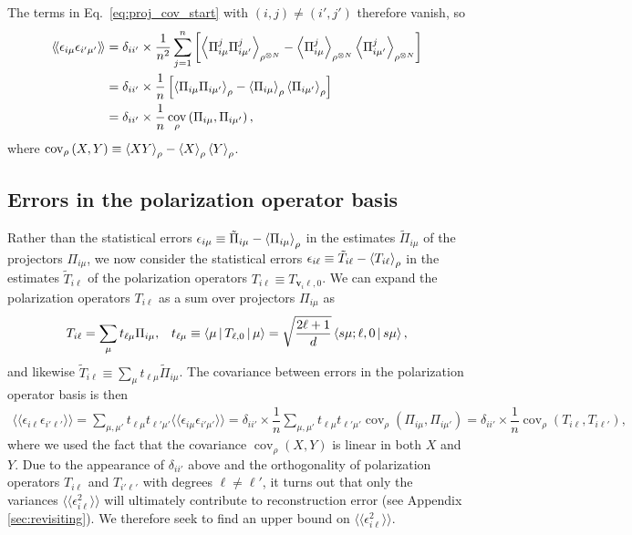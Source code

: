 \documentclass[a4paper,twocolumn,unpublished]{quantumarticle}
\newcommand{\f}[2]{\dfrac{#1}{#2}} %
\newcommand{\p}[1]{\left(#1\right)} %
\renewcommand{\sp}[1]{\left[#1\right]} %
\newcommand{\bk}{\Braket} %
\newcommand{\bbk}[1]{\langle\!\langle #1 \rangle\!\rangle}
\DeclareMathOperator{\cov}{cov}
\begin{document}
The terms in Eq.~\eqref{eq:proj_cov_start} with $\p{i,j}\ne\p{i',j'}$ therefore vanish, so
\begin{align}
  \bbk{\epsilon_{i\mu} \epsilon_{i'\mu'}}
  &= \delta_{ii'} \times \f1{n^2} \sum_{j=1}^n \sp{\bk{\Pi_{i\mu}^j \Pi_{i\mu'}^j}_{\rho^{\otimes N}}
    - \bk{\Pi_{i\mu}^j}_{\rho^{\otimes N}}
    \bk{\Pi_{i\mu'}^j}_{\rho^{\otimes N}}} \\
  &= \delta_{ii'} \times \f1n \sp{\bk{\Pi_{i\mu} \Pi_{i\mu'}}_\rho
    - \bk{\Pi_{i\mu}}_\rho \bk{\Pi_{i\mu'}}_\rho} \\
  &= \delta_{ii'} \times \f1n \cov_\rho\p{\Pi_{i\mu}, \Pi_{i\mu'}},
\end{align}
where $\cov_\rho\p{X,Y} \equiv \bk{XY}_\rho - \bk{X}_\rho \bk{Y}_\rho$.

\subsection{Errors in the polarization operator basis}

Rather than the statistical errors $\epsilon_{i\mu} \equiv \tilde\Pi_{i\mu} - \bk{\Pi_{i\mu}}_\rho$ in the estimates $\tilde\Pi_{i\mu}$ of the projectors $\Pi_{i\mu}$, we now consider the statistical errors $\epsilon_{i\ell} \equiv \tilde T_{i\ell} - \bk{T_{i\ell}}_\rho$ in the estimates $\tilde T_{i\ell}$ of the polarization operators $T_{i\ell} \equiv T_{\bm v_i\ell,0}$.
We can expand the polarization operators $T_{i\ell}$ as a sum over projectors $\Pi_{i\mu}$ as
\begin{align}
  T_{i\ell} = \sum_\mu t_{\ell\mu} \Pi_{i\mu},
  &&
  t_{\ell\mu} \equiv \bk{\mu|T_{\ell,0}|\mu}
  = \sqrt{\f{2\ell+1}{d}} \bk{s\mu;\ell,0|s\mu},
\end{align}
and likewise $\tilde T_{i\ell} \equiv \sum_\mu t_{\ell\mu} \tilde\Pi_{i\mu}$.
The covariance between errors in the polarization operator basis is then
\begin{align}
  \bbk{\epsilon_{i\ell} \epsilon_{i'\ell'}}
  = \sum_{\mu,\mu'} t_{\ell\mu} t_{\ell'\mu'}
  \bbk{\epsilon_{i\mu} \epsilon_{i'\mu'}}
  = \delta_{ii'} \times \f1n
  \sum_{\mu,\mu'} t_{\ell\mu} t_{\ell'\mu'}
  \cov_\rho\p{\Pi_{i\mu}, \Pi_{i\mu'}}
  = \delta_{ii'} \times \f1n \cov_\rho\p{T_{i\ell}, T_{i\ell'}},
\end{align}
where we used the fact that the covariance $\cov_\rho\p{X,Y}$ is linear in both $X$ and $Y$.
Due to the appearance of $\delta_{ii'}$ above and the orthogonality of polarization operators $T_{i\ell}$ and $T_{i'\ell'}$ with degrees $\ell\ne\ell'$, it turns out that only the variances $\bbk{\epsilon_{i\ell}^2}$ will ultimately contribute to reconstruction error (see Appendix \ref{sec:revisiting}).
We therefore seek to find an upper bound on $\bbk{\epsilon_{i\ell}^2}$.
\end{document}
